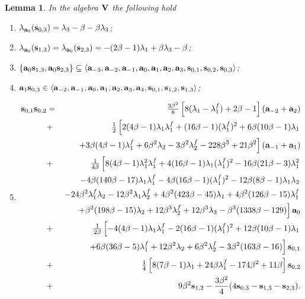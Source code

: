 \documentclass[a4paper]{amsart}
\newtheorem{lemma}{Lemma}[section]
\newcommand{\Vo}{{\bf V}}
\newcommand{\lm}{\lambda}
\newcommand{\lmu}{\lambda_1}
\newcommand{\lmf}{\lambda_1^f}
\newcommand{\lmd}{\lambda_2}
\newcommand{\lmdf}{\lambda_2^f}
\newcommand{\lmt}{\lambda_3}
\newcommand{\bt}{\beta}
\newcommand{\ba}{{\bf a}}
\newcommand{\bs}{{\bf s}}
\begin{document}
\begin{lemma} \label{s1s2}
In the algebra $\Vo$ the following hold
\begin{enumerate}
\item $\lambda_{\ba_0}(\bs_{0,3})=\lm_3-\bt-\bt\lm_3$;
\item $\lambda_{\ba_0}(\bs_{1,3})=\lambda_{\ba_0}(\bs_{2,3})=-(2\bt-1)\lmu+\bt\lm_3-\bt$;
\item $\{ \ba_0\bs_{1,3}, \ba_0\bs_{2,3}\}\subseteq \langle  \ba_{-3}, \ba_{-2},  \ba_{-1}, \ba_0, \ba_1, \ba_2, \ba_3, \bs_{0,1}, \bs_{0,2}, \bs_{0,3} \rangle$;
\item $\ba_1\bs_{0,3}\in \langle   \ba_{-2},  \ba_{-1}, \ba_0, \ba_1, \ba_2, \ba_3, \ba_4, \bs_{0,1}, \bs_{1,2}, \bs_{1,3} \rangle$;
\item 
\begin{eqnarray*} %
\bs_{0,1}\bs_{0,2}&=&
\tfrac{3\bt^2}{8}\left [8(\lmu-\lmf)+2\bt-1\right ](\ba_{-2}+\ba_2)\\
&+&
\tfrac{1}{2}\left [2(4\bt-1)\lmu \lmf+(16\bt-1)(\lmf)^2+6\bt(10\bt-1)\lmu \right . \\
&&\left . +3\bt(4\bt-1)\lmf+6\bt^2\lmd-3\bt^2\lmdf -228\bt^3+21\bt^2\right ](\ba_{-1}+\ba_1)\\
&+&
\tfrac{1}{4\bt}\left [8(4\bt-1)\lmu^2\lmf+4(16\bt-1)\lmu(\lmf)^2-16\bt(21\bt-3)\lmu^2 \right . \\
&&\left . -4\bt(140\bt-17)\lmu\lmf-4\bt(16\bt-1)(\lmf)^2-12\bt(8\bt-1)\lmu\lmd \right . \\
&& \left . -24\bt^2\lmf \lmd-12\bt^2\lmu\lmdf+4\bt^2(423\bt-45)\lmu+4\bt^2(126\bt-15)\lmf \right . \\
&& \left . +\bt^2(198\bt-15)\lmd+12\bt^3\lmdf+12\bt^3\lmt-\bt^3(1338\bt-129)\right ] \ba_0\\
&+&
\tfrac{1}{2\bt}\left [-4(4\bt-1)\lmu\lmf-2(16\bt-1)(\lmf)^2+12\bt(10\bt-1)\lmu \right .\\
&& \left . +6\bt(36\bt-5)\lmf+12\bt^2\lmd+6\bt^2\lmdf-3\bt^2(163\bt-16)\right ]\bs_{0,1}\\
&+&
\tfrac{1}{4}\left [8(7\bt-1)\lmu+24\bt\lmf-174\bt^2+11\bt\right ] \bs_{0,2}\\
&+& 9\bt^2 \bs_{1,2}
-\frac{3\bt^2}{4}(4\bs_{0,3}-\bs_{1,3}-\bs_{2,3}).
\end{eqnarray*}
\end{enumerate}
\end{lemma}
\end{document}
